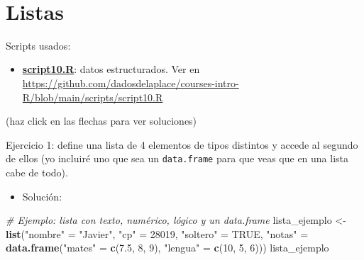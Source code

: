 \documentclass[11pt,]{book}
\newenvironment{Shaded}{\begin{snugshade}}{\end{snugshade}}
\newcommand{\CommentTok}[1]{\textcolor[rgb]{0.37,0.37,0.37}{\textit{#1}}}
\newcommand{\DecValTok}[1]{\textcolor[rgb]{0.06,0.06,0.06}{#1}}
\newcommand{\FloatTok}[1]{\textcolor[rgb]{0.06,0.06,0.06}{#1}}
\newcommand{\KeywordTok}[1]{\textcolor[rgb]{0.27,0.27,0.27}{\textbf{#1}}}
\newcommand{\NormalTok}[1]{#1}
\newcommand{\OtherTok}[1]{\textcolor[rgb]{0.37,0.37,0.37}{#1}}
\newcommand{\StringTok}[1]{\textcolor[rgb]{0.5,0.5,0.5}{#1}}
\providecommand{\tightlist}{%
  \setlength{\itemsep}{0pt}\setlength{\parskip}{0pt}}
\begin{document}
~

\hypertarget{listas}{%
\section{Listas}\label{listas}}

\begin{blackbox}

Scripts usados:

\begin{itemize}
\tightlist
\item
  \href{https://github.com/dadosdelaplace/courses-intro-R/blob/main/scripts/script10.R}{\textbf{script10.R}}: datos estructurados. Ver en \url{https://github.com/dadosdelaplace/courses-intro-R/blob/main/scripts/script10.R}
\end{itemize}


\end{blackbox}

(haz click en las flechas para ver soluciones)

Ejercicio 1: define una lista de 4 elementos de tipos distintos y accede al segundo de ellos (yo incluiré uno que sea un \texttt{data.frame} para que veas que en una lista cabe de todo).

\begin{itemize}
\tightlist
\item
  Solución:
\end{itemize}

\begin{Shaded}
\begin{Highlighting}[]
\CommentTok{# Ejemplo: lista con texto, numérico, lógico y un data.frame}
\NormalTok{lista_ejemplo <-}\StringTok{ }\KeywordTok{list}\NormalTok{(}\StringTok{"nombre"}\NormalTok{ =}\StringTok{ "Javier"}\NormalTok{, }\StringTok{"cp"}\NormalTok{ =}\StringTok{ }\DecValTok{28019}\NormalTok{,}
                      \StringTok{"soltero"}\NormalTok{ =}\StringTok{ }\OtherTok{TRUE}\NormalTok{,}
                      \StringTok{"notas"}\NormalTok{ =}\StringTok{ }\KeywordTok{data.frame}\NormalTok{(}\StringTok{"mates"}\NormalTok{ =}\StringTok{ }\KeywordTok{c}\NormalTok{(}\FloatTok{7.5}\NormalTok{, }\DecValTok{8}\NormalTok{, }\DecValTok{9}\NormalTok{),}
                                           \StringTok{"lengua"}\NormalTok{ =}\StringTok{ }\KeywordTok{c}\NormalTok{(}\DecValTok{10}\NormalTok{, }\DecValTok{5}\NormalTok{, }\DecValTok{6}\NormalTok{)))}
\NormalTok{lista_ejemplo}
\end{Highlighting}
\end{Shaded}
\end{document}
